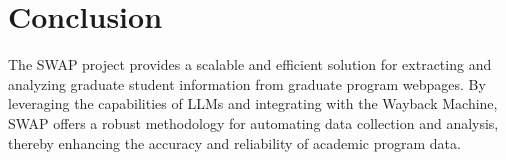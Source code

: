 \documentclass[11pt]{article}
\begin{document}
\section{Conclusion}

The SWAP project provides a scalable and efficient solution for extracting and analyzing graduate student information from graduate program webpages.
By leveraging the capabilities of LLMs and integrating with the Wayback Machine, SWAP offers a robust methodology for automating data collection and analysis, thereby enhancing the accuracy and reliability of academic program data.
\end{document}
